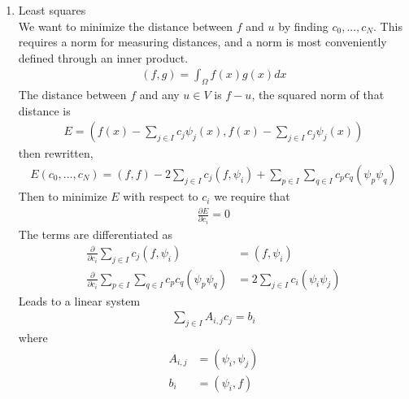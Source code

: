 \documentclass[11pt,a4paper]{article}
\begin{document}
\begin{enumerate}
\item Least squares\\
We want to minimize the distance between $f$ and $u$ by finding $c_0,...,c_N$. This requires a norm for measuring distances, and a norm is most conveniently defined through an inner product. 
\begin{align}
(f,g) = \int_\Omega f(x)g(x)dx
\end{align}
The distance between $f$ and any $u\in V$ is $f-u$, the squared norm of that distance is
\begin{align}
E=(f(x)-\sum_{j\in I} c_j\psi_j(x),f(x)-\sum_{j\in I} c_j\psi_j(x)) 
\end{align}
then rewritten,
\begin{align*}
E(c_0,...,c_N)=(f,f)-2\sum_{j\in I}c_j(f,\psi_i)+\sum_{p\in I}\sum_{q\in I}c_pc_q(\psi_p\psi_q)
\end{align*}
Then to minimize $E$ with respect to $c_i$ we require that 
\begin{align}
\frac{\partial E}{\partial c_i} = 0
\end{align}
The terms are differentiated as
\begin{align*}
\frac{\partial }{\partial c_i}\sum_{j\in I}c_j(f,\psi_i) &= (f,\psi_i)\\
\frac{\partial }{\partial c_i}\sum_{p\in I}\sum_{q\in I}c_pc_q(\psi_p\psi_q) &= 2\sum_{j\in I}c_i(\psi_i\psi_j)
\end{align*}
Leads to a linear system 
\begin{align}
\sum_{j\in I}A_{i,j}c_j = b_i
\end{align}
where
\begin{align*}
A_{i,j} &= (\psi_i,\psi_j)\\
b_i &= (\psi_i, f)
\end{align*}


\end{enumerate}
\end{document}
